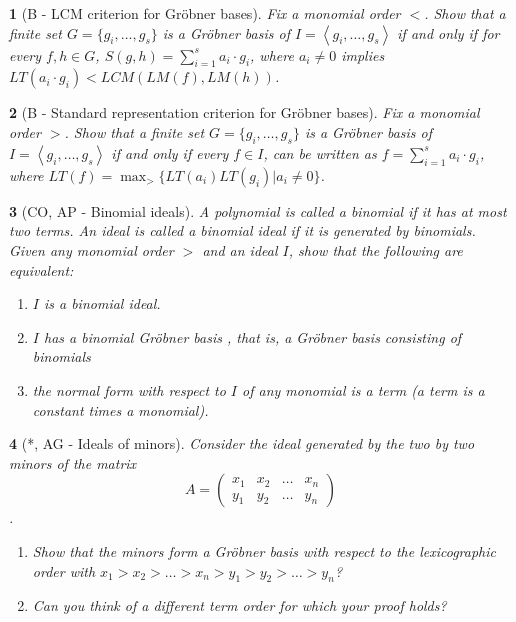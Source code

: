 \documentclass[11pt]{article}
\theoremstyle{problem}
\newtheorem{p}{}
\newcommand{\GB}{Gr\"obner basis }
\newcommand{\G}{Gr\"obner }
\begin{document}
{%

\begin{p} [B - LCM criterion for \G bases]
Fix a monomial order $<$. Show that a finite set $G=\{g_i,\ldots, g_s\}$ is a \GB of $I=\left<g_i,\ldots, g_s\right>$ if and only if for every
$f,h \in G$, $S(g,h) = \sum_{i=1}^s a_i\cdot g_i$, where $a_i\neq 0$ implies
$LT(a_i\cdot g_i) < LCM(LM(f), LM(h))$. 
\end{p}



\begin{p} [B - Standard representation criterion for \G bases]
Fix a monomial order $>$. Show that a finite set $G=\{g_i,\ldots, g_s\}$ is a \GB of $I=\left<g_i,\ldots, g_s\right>$ if and only if every
$f\in I$, can be written as $f= \sum_{i=1}^s a_i\cdot g_i$, where $LT(f)=\max_>\{LT(a_i ) LT(g_i ) | a_i\neq 0\}$.\end{p}





\begin{p} [CO, AP - Binomial ideals]
A polynomial is called a binomial if it has at most two terms. An ideal  is called a binomial ideal if it
is generated by binomials. Given any  monomial order $>$ and an ideal $I$, show
that the following are equivalent:
\begin{enumerate}
\item $I$ is a binomial ideal.
\item $I$ has a binomial \GB, that is, a \GB consisting of binomials
\item the normal form with respect to $I$ of any monomial is a term (a term is a constant times a monomial).
\end{enumerate}
\end{p}



\begin{p}[*, AG - Ideals of minors]
Consider the ideal generated by the two by two minors of the matrix
$$A = \left( \begin{matrix} x_1& x_2& \ldots & x_n \\ y_1& y_2 & \ldots & y_n \end{matrix}\right)$$. 
\begin{enumerate}
\item Show that the minors  form a \GB with respect to the lexicographic order with $x_1>x_2>\ldots >x_n>y_1>y_2>\ldots >y_n$? 
\item Can you think of a different term order for which your proof holds?
\end{enumerate}
\end{p}


}
\end{document}
